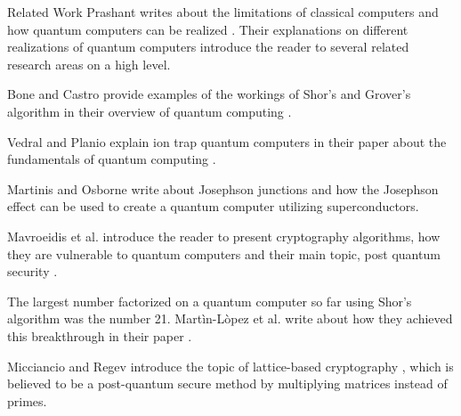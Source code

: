 \documentclass[aps,preprintnumbers,twocolumn]{revtex4}
\begin{document}
\begin{section}{Related Work}
Prashant writes about the limitations of classical computers and how quantum computers can be realized \cite{prashant}. 
Their explanations on different realizations of quantum computers introduce the reader to several related research areas on a high level. 

Bone and Castro provide examples of the workings of Shor's and Grover's algorithm in their overview of quantum computing \cite{Bone}.

Vedral and Planio explain ion trap quantum computers in their paper about the fundamentals of quantum computing \cite{2008}.

Martinis and Osborne write about Josephson junctions \cite{martinis} and how the Josephson effect can be used to create a quantum computer utilizing superconductors.

Mavroeidis et al. introduce the reader to present cryptography algorithms, how they are vulnerable to quantum computers and their main topic, post quantum security \cite{DBLP:journals/corr/abs-1804-00200}. 

The largest number factorized on a quantum computer so far using Shor's algorithm was the number 21. Martìn-Lòpez et al. write about how they achieved this breakthrough in their paper \cite{article}.

Micciancio and Regev introduce the topic of lattice-based cryptography \cite{Micciancio2009}, which is believed to be a post-quantum secure method by multiplying matrices instead of primes.

\end{section}
\end{document}
